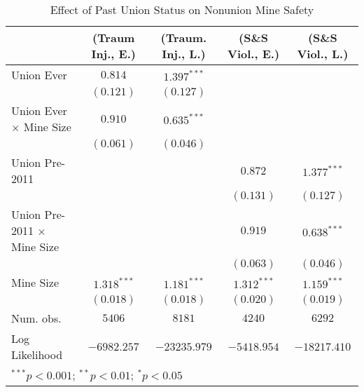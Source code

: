 
\begin{table}[H]
\begin{center}
\begin{tabular}{l c c c c}
\hline
 & (Traum Inj., E.) & (Traum. Inj., L.) & (S\&S Viol., E.) & (S\&S Viol., L.) \\
\hline
Union Ever                          & $0.814$       & $1.397^{***}$ &               &               \\
                                    & $(0.121)$     & $(0.127)$     &               &               \\
Union Ever $ \times $ Mine Size     & $0.910$       & $0.635^{***}$ &               &               \\
                                    & $(0.061)$     & $(0.046)$     &               &               \\
Union Pre-2011                      &               &               & $0.872$       & $1.377^{***}$ \\
                                    &               &               & $(0.131)$     & $(0.127)$     \\
Union Pre-2011 $ \times $ Mine Size &               &               & $0.919$       & $0.638^{***}$ \\
                                    &               &               & $(0.063)$     & $(0.046)$     \\
Mine Size                           & $1.318^{***}$ & $1.181^{***}$ & $1.312^{***}$ & $1.159^{***}$ \\
                                    & $(0.018)$     & $(0.018)$     & $(0.020)$     & $(0.019)$     \\
\hline
Num. obs.                           & $5406$        & $8181$        & $4240$        & $6292$        \\
Log Likelihood                      & $-6982.257$   & $-23235.979$  & $-5418.954$   & $-18217.410$  \\
\hline
\multicolumn{5}{l}{\scriptsize{$^{***}p<0.001$; $^{**}p<0.01$; $^{*}p<0.05$}}
\end{tabular}
\caption{Effect of Past Union Status on Nonunion Mine Safety}
\label{irr_100employees_union_inertia}
\end{center}
\end{table}

